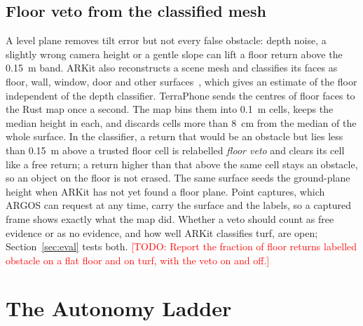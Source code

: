 \documentclass[conference]{IEEEtran}
\newcommand{\todo}[1]{\textcolor{red}{[TODO: #1]}}
\begin{document}
\subsection{Floor veto from the classified mesh}
A level plane removes tilt error but not every false obstacle: depth noise, a slightly wrong camera height or a gentle slope can lift a floor return above the 0.15~m band.
ARKit also reconstructs a scene mesh and classifies its faces as floor, wall, window, door and other surfaces~\cite{apple2026arkit}, which gives an estimate of the floor independent of the depth classifier.
TerraPhone sends the centres of floor faces to the Rust map once a second.
The map bins them into 0.1~m cells, keeps the median height in each, and discards cells more than 8~cm from the median of the whole surface.
In the classifier, a return that would be an obstacle but lies less than 0.15~m above a trusted floor cell is relabelled \emph{floor veto} and clears its cell like a free return; a return higher than that above the same cell stays an obstacle, so an object on the floor is not erased.
The same surface seeds the ground-plane height when ARKit has not yet found a floor plane.
Point captures, which ARGOS can request at any time, carry the surface and the labels, so a captured frame shows exactly what the map did.
Whether a veto should count as free evidence or as no evidence, and how well ARKit classifies turf, are open; Section~\ref{sec:eval} tests both.
\todo{Report the fraction of floor returns labelled obstacle on a flat floor and on turf, with the veto on and off.}

\section{The Autonomy Ladder}
\label{sec:ladder}
\end{document}
